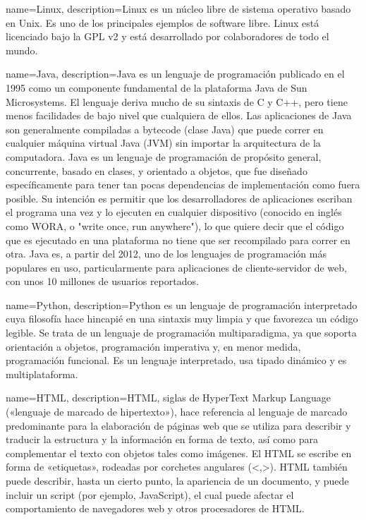 {name=Linux,
 description={Linux es un núcleo libre de sistema operativo basado en Unix. Es uno de los principales ejemplos de software libre. Linux está licenciado bajo la GPL v2 y está desarrollado por colaboradores de todo el mundo.}
 }

{name=Java,
 description={Java es un lenguaje de programación publicado en el 1995 como un componente fundamental de la plataforma Java de Sun Microsystems. El lenguaje deriva mucho de su sintaxis de C y C++, pero tiene menos facilidades de bajo nivel que cualquiera de ellos. Las aplicaciones de Java son generalmente compiladas a bytecode (clase Java) que puede correr en cualquier máquina virtual Java (JVM) sin importar la arquitectura de la computadora. Java es un lenguaje de programación de propósito general, concurrente, basado en clases, y orientado a objetos, que fue diseñado específicamente para tener tan pocas dependencias de implementación como fuera posible. Su intención es permitir que los desarrolladores de aplicaciones escriban el programa una vez y lo ejecuten en cualquier dispositivo (conocido en inglés como WORA, o "write once, run anywhere"), lo que quiere decir que el código que es ejecutado en una plataforma no tiene que ser recompilado para correr en otra. Java es, a partir del 2012, uno de los lenguajes de programación más populares en uso, particularmente para aplicaciones de cliente-servidor de web, con unos 10 millones de usuarios reportados.}
 }
 
{name=Python,
 description={Python es un lenguaje de programación interpretado cuya filosofía hace hincapié en una sintaxis muy limpia y que favorezca un código legible. Se trata de un lenguaje de programación multiparadigma, ya que soporta orientación a objetos, programación imperativa y, en menor medida, programación funcional. Es un lenguaje interpretado, usa tipado dinámico y es multiplataforma.}
 }
 
{name=HTML,
 description={HTML, siglas de HyperText Markup Language («lenguaje de marcado de hipertexto»), hace referencia al lenguaje de marcado predominante para la elaboración de páginas web que se utiliza para describir y traducir la estructura y la información en forma de texto, así como para complementar el texto con objetos tales como imágenes. El HTML se escribe en forma de «etiquetas», rodeadas por corchetes angulares (<,>). HTML también puede describir, hasta un cierto punto, la apariencia de un documento, y puede incluir un script (por ejemplo, JavaScript), el cual puede afectar el comportamiento de navegadores web y otros procesadores de HTML.}
 }
 
